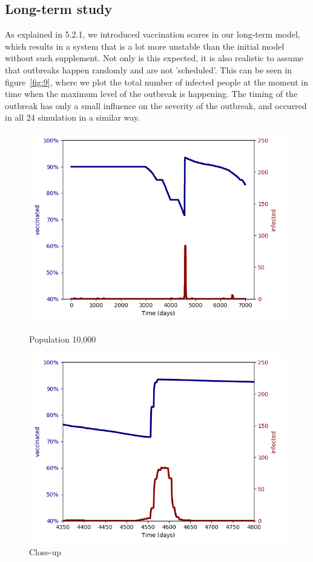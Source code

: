 \documentclass[11pt]{article}
\begin{document}
\subsection{Long-term study}
As explained in 5.2.1, we introduced vaccination scares in our long-term model, which results in a system that is a lot more unstable than the initial model without such supplement. Not only is this expected, it is also realistic to assume that outbreaks happen randomly and are not 'scheduled'. This can be seen in figure~\ref{fig:9}, where we plot the total number of infected people at the moment in time when the maximum level of the outbreak is happening. The timing of the outbreak has only a small influence on the severity of the outbreak, and occurred in all 24 simulation in a similar way. 
\begin{figure}
\centering
\begin{minipage}{.5\textwidth}
  \centering
  \includegraphics[width=1\linewidth]{04a10000200001p2fixedtime5001p5sv0p001}
  \caption{Population 10,000}  
  \label{fig:7}
  
\end{minipage}%
\begin{minipage}{.5\textwidth}
  \centering
  \includegraphics[width=1\linewidth]{04b10000200001p2fixedtime5001p5sv0p001}
  \caption{Close-up}
  \label{fig:8}
 
\end{minipage}%
\end{figure}
\end{document}
